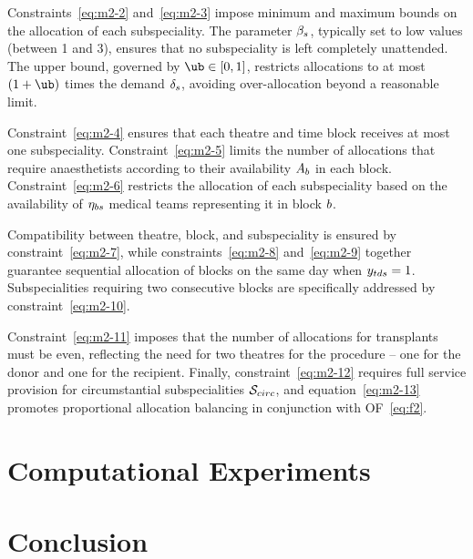 \documentclass[review,3p,authoryear]{elsarticle}
\begin{document}
Constraints~\eqref{eq:m2-2} and~\eqref{eq:m2-3} impose minimum and maximum bounds on the allocation of each subspeciality.
The parameter $\beta_{s}$, typically set to low values (between 1 and 3), ensures that no subspeciality is left completely unattended.
The upper bound, governed by $\ub \in [0,1]$, restricts allocations to at most $(1+\ub)$ times the demand $\delta_{s}$, avoiding over-allocation beyond a reasonable limit.

Constraint~\eqref{eq:m2-4} ensures that each theatre and time block receives at most one subspeciality.
Constraint~\eqref{eq:m2-5} limits the number of allocations that require anaesthetists according to their availability $A_{b}$ in each block.
Constraint~\eqref{eq:m2-6} restricts the allocation of each subspeciality based on the availability of $\eta_{bs}$ medical teams representing it in block $b$.

Compatibility between theatre, block, and subspeciality is ensured by constraint~\eqref{eq:m2-7}, while constraints~\eqref{eq:m2-8} and~\eqref{eq:m2-9} together guarantee sequential allocation of blocks on the same day when $y_{tds} = 1$.
Subspecialities requiring two consecutive blocks are specifically addressed by constraint~\eqref{eq:m2-10}.

Constraint~\eqref{eq:m2-11} imposes that the number of allocations for transplants must be even, reflecting the need for two theatres for the procedure -- one for the donor and one for the recipient.
Finally, constraint~\eqref{eq:m2-12} requires full service provision for circumstantial subspecialities $\mathcal{S}_{circ}$, and equation~\eqref{eq:m2-13} promotes proportional allocation balancing in conjunction with OF~\eqref{eq:f2}.

\section{Computational Experiments\label{sec:exp}}

\section{Conclusion\label{sec:conc}}
\end{document}
